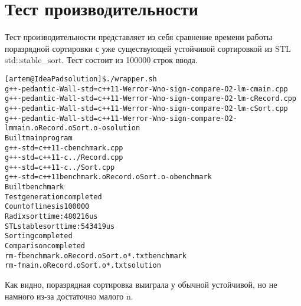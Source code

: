 \section{Тест производительности}

Тест производительности представляет из себя сравнение времени работы поразрядной сортировки с уже существующей устойчивой сортировкой из STL std::stable\_sort.
Тест состоит из 100000 строк ввода.

\begin{alltt}

[artem@IdeaPad solution]\$ ./wrapper.sh 
g++ -pedantic -Wall -std=c++11 -Werror -Wno-sign-compare -O2 -lm -c main.cpp
g++ -pedantic -Wall -std=c++11 -Werror -Wno-sign-compare -O2 -lm -c Record.cpp
g++ -pedantic -Wall -std=c++11 -Werror -Wno-sign-compare -O2 -lm -c Sort.cpp
g++ -pedantic -Wall -std=c++11 -Werror -Wno-sign-compare -O2 -lm main.o Record.o Sort.o -o solution
Built main program
g++ -std=c++11 -c benchmark.cpp
g++ -std=c++11 -c ../Record.cpp
g++ -std=c++11 -c ../Sort.cpp
g++ -std=c++11 benchmark.o Record.o Sort.o -o benchmark
Built benchmark
Test generation completed
Count of lines is 100000
Radix sort time: 480216us
STL stable sort time: 543419us 
Sorting completed
Comparison completed
rm -f benchmark.o Record.o Sort.o *.txt benchmark
rm -f main.o Record.o Sort.o *.txt solution

\end{alltt}

Как видно, поразрядная сортировка выиграла у обычной устойчивой, но не намного из-за достаточно малого n.

\pagebreak
